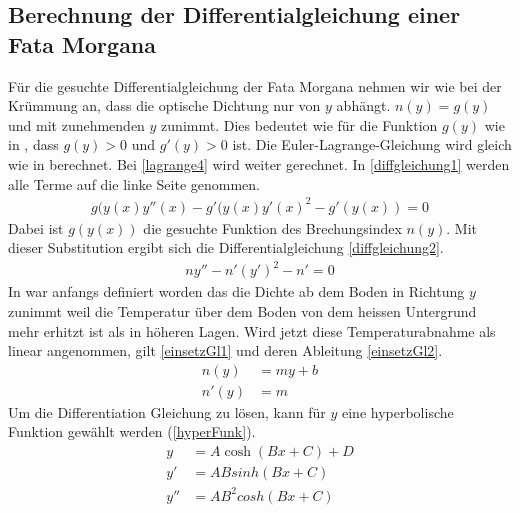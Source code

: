 \subsection{Berechnung der Differentialgleichung einer Fata Morgana \label{sec:diffgleichung}}
Für die gesuchte Differentialgleichung der Fata Morgana nehmen wir wie bei der Krümmung an, dass die optische Dichtung nur von $y$ abhängt. 
$n(y) = g(y)$ und mit zunehmenden $y$ zunimmt. Dies bedeutet wie für die Funktion $g(y)$ wie in , dass $g(y) > 0$ und $g'(y) > 0 $ ist.
Die Euler-Lagrange-Gleichung wird gleich wie in  berechnet. Bei \eqref{lagrange4} wird weiter gerechnet. In \eqref{diffgleichung1} werden alle Terme auf die linke Seite genommen.
\begin{align}
	g(y(x) y''(x)-g'(y(x) y'(x)^2 - g'(y(x)) =0 
	\label{diffgleichung1}
\end{align}
Dabei ist $g(y(x))$ die gesuchte Funktion des Brechungsindex $n(y)$. Mit dieser Substitution ergibt sich die Differentialgleichung
\ref{diffgleichung2}.
\begin{align}
	n y''-n' (y')^2 - n' =0 
	\label{diffgleichung2}
\end{align}
In  war anfangs definiert worden das die Dichte ab dem Boden in Richtung $y$ zunimmt weil die Temperatur über dem Boden von dem heissen Untergrund mehr erhitzt ist als in höheren Lagen. Wird jetzt diese Temperaturabnahme als linear angenommen, gilt \eqref{einsetzGl1} und deren Ableitung \eqref{einsetzGl2}.
\begin{align}
	n(y)&=my+b \label{einsetzGl1} \\
	n'(y)&=m \label{einsetzGl2}
\end{align}
Um die Differentiation Gleichung zu lösen, kann für $y$ eine hyperbolische Funktion \cite{cosh} gewählt werden (\eqref{hyperFunk}).
\begin{align}
	y&=A\cosh(Bx+C)+D \label{hyperFunk} \\
	y'&= A B sinh(B x + C) \label{hyperFunkDx} \\
	y''&= A B^2 cosh(B x + C) \label{hyperFunkD2x}
\end{align}

